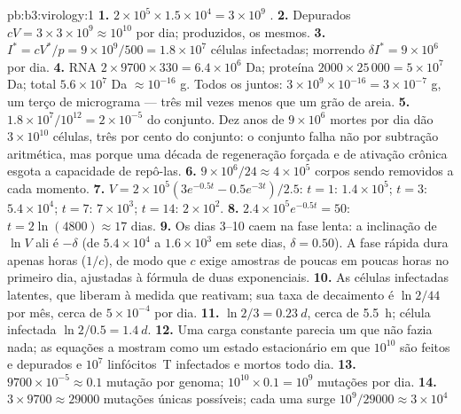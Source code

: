 \begin{solution}{pb:b3:virology:1}
\textbf{1.} $2\times 10^{5}\times 1.5\times 10^{4} = 3\times 10^{9}$
.
\textbf{2.} Depurados $cV = 3\times 3\times 10^{9} \approx 10^{10}$ por
dia; produzidos, os mesmos.
\textbf{3.} $I^{*} = cV^{*}/p = 9\times 10^{9}/500 = 1.8\times 10^{7}$
células infectadas; morrendo $\delta I^{*} = 9\times 10^{6}$ por dia.
\textbf{4.} RNA $2\times 9700\times 330 = 6.4\times 10^{6}$ Da; proteína
$2000\times 25\,000 = 5\times 10^{7}$ Da; total $5.6\times 10^{7}$ Da
$\approx 10^{-16}$ g. Todos os  juntos: $3\times 10^{9}\times
10^{-16} = 3\times 10^{-7}$ g, um terço de micrograma --- três mil
vezes menos que um grão de areia.
\textbf{5.} $1.8\times 10^{7}/10^{12} = 2\times 10^{-5}$ do conjunto.
Dez anos de $9\times 10^{6}$ mortes por dia dão $3\times 10^{10}$
células, três por cento do conjunto: o conjunto falha não por subtração
aritmética, mas porque uma década de regeneração forçada e de ativação
crônica esgota a capacidade de repô-las.
\textbf{6.} $9\times 10^{6}/24 \approx 4\times 10^{5}$ corpos sendo
removidos a cada momento.
\textbf{7.} $V = 2\times 10^{5}(3e^{-0.5t} - 0.5e^{-3t})/2.5$: $t = 1$:
$1.4\times 10^{5}$; $t = 3$: $5.4\times 10^{4}$; $t = 7$: $7\times
10^{3}$; $t = 14$: $2\times 10^{2}$.
\textbf{8.} $2.4\times 10^{5}e^{-0.5t} = 50$: $t = 2\ln(4800) \approx 17$
dias.
\textbf{9.} Os dias 3--10 caem na fase lenta: a inclinação de $\ln V$ ali
é $-\delta$ (de $5.4\times 10^{4}$ a $1.6\times 10^{3}$ em sete dias,
$\delta = 0.50$). A fase rápida dura apenas horas ($1/c$), de modo que
$c$ exige amostras de poucas em poucas horas no primeiro dia, ajustadas
à fórmula de duas exponenciais.
\textbf{10.} As células infectadas latentes, que liberam  à medida
que reativam; sua taxa de decaimento é $\ln 2/44$ por mês, cerca de
$5\times 10^{-4}$ por dia.
\textbf{11.}  $\ln 2/3 = \qty{0.23}{d}$, cerca de \qty{5.5}{h};
célula infectada $\ln 2/0.5 = \qty{1.4}{d}$.
\textbf{12.} Uma carga constante parecia um  que não fazia nada; as
equações a mostram como um estado estacionário em que $10^{10}$ 
são feitos e depurados e $10^{7}$ linfócitos~T infectados e mortos todo
dia.
\textbf{13.} $9700\times 10^{-5} \approx 0.1$ mutação por genoma;
$10^{10}\times 0.1 = 10^{9}$ mutações por dia.
\textbf{14.} $3\times 9700 \approx \num{29000}$ mutações únicas
possíveis; cada uma surge $10^{9}/\num{29000} \approx 3\times 10^{4}$

\end{solution}
